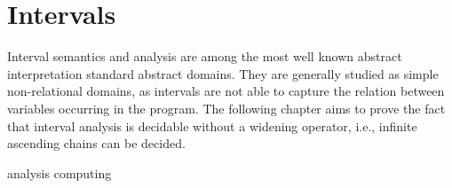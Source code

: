 \chapter{Intervals}

Interval semantics and analysis are among the most well known abstract
interpretation standard abstract domains. They are generally studied
as simple non-relational domains, as intervals are not able to capture
the relation between variables occurring in the program.  The
following chapter aims to prove the fact that interval analysis is
decidable without a widening operator, i.e., infinite ascending chains
can be decided.

{analysis}
{computing}
